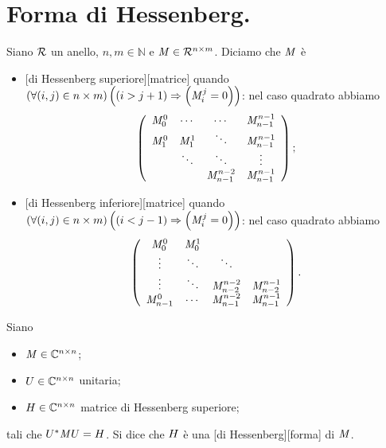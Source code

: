 \section{Forma di Hessenberg.}
\label{MetodiNumericiPerSistemiLineari_FormaDiHessenberg}
\begin{Definition}
	Siano $\mathcal{R}$ un anello, $n, m \in \mathbb{N}$ e $\mathit{M} \in \mathcal{R}^{n \times m}$.
  Diciamo che $\mathit{M}$ \`e
	\begin{itemize}
		\item {}[di Hessenberg superiore][matrice] quando
      $\left ( \forall (i,j) \in n \times m \right ) \left ( \left ( i > j + 1 \right ) \Rightarrow \left ( \mathit{M}_i^j = 0 \right ) \right )$:
      nel caso quadrato abbiamo
\[
\left (
\begin{array}{cccc}
\mathit{M}_0^0 & \cdots & \cdots & \mathit{M}_{n - 1}^{n - 1}\\
\mathit{M}_1^0 & \mathit{M}_1^1 & \ddots & \mathit{M}_{n - 1}^{n - 1}\\
& \ddots & \ddots & \vdots\\
& & \mathit{M}_{n - 1}^{n - 2} & \mathit{M}_{n - 1}^{n - 1}
\end{array}
\right );
\]
		\item {}[di Hessenberg inferiore][matrice] quando
      $\left ( \forall (i,j) \in n \times m \right ) \left ( \left ( i < j - 1 \right ) \Rightarrow \left ( \mathit{M}_i^j = 0 \right ) \right )$:
      nel caso quadrato abbiamo
\[
\left (
\begin{array}{cccc}
\mathit{M}_0^0 & \mathit{M}_0^1 &\\
\vdots & \ddots & \ddots &\\
\vdots & \ddots & \mathit{M}_{n - 2}^{n - 2} & \mathit{M}_{n - 2}^{n - 1}\\
\mathit{M}_{n - 1}^0 & \cdots & \mathit{M}_{n - 1}^{n - 2} & \mathit{M}_{n - 1}^{n - 1}\\
\end{array}
\right ).
\]
  \end{itemize}
\end{Definition}
\begin{Definition}
  Siano
  \begin{itemize}
    \item $\mathit{M} \in \mathbb{C}^{n \times n}$;
    \item $U \in \mathbb{C}^{n \times n}$ unitaria;
    \item $H \in \mathbb{C}^{n \times n}$ matrice di Hessenberg
      superiore;
  \end{itemize}
  tali che ${U}^* \mathit{M} U = H$.
  Si dice che $H$ \`e una
  [di Hessenberg][forma] di $\mathit{M}$.
\end{Definition}

